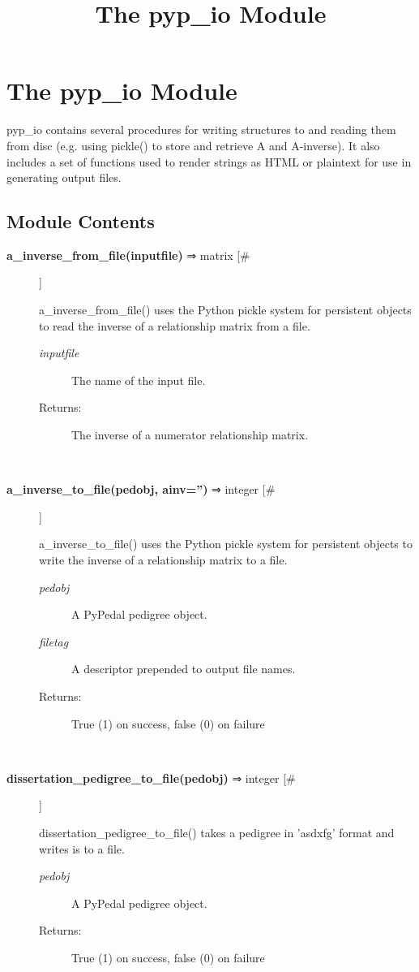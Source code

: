 \documentclass[10pt]{article}
\title{The pyp\_io Module}
\begin{document}
\section*{The pyp\_io Module}


 pyp\_io contains several procedures for writing structures to and reading them from disc (e.g. using pickle() to store and retrieve A and A-inverse). It also includes a set of functions used to render strings as HTML or plaintext for use in generating output files.
\subsection*{Module Contents}
\begin{description}
\item[\textbf{a\_inverse\_from\_file(inputfile)}
 ⇒ matrix [\#]]

 a\_inverse\_from\_file() uses the Python pickle system for persistent objects to read the inverse of a relationship matrix from a file.
\begin{description}
\item[\emph{inputfile}
] The name of the input file.
\item[Returns:] The inverse of a numerator relationship matrix.

\end{description}
\\ 

\item[\textbf{a\_inverse\_to\_file(pedobj, ainv='')}
 ⇒ integer [\#]]

 a\_inverse\_to\_file() uses the Python pickle system for persistent objects to write the inverse of a relationship matrix to a file.
\begin{description}
\item[\emph{pedobj}
] A PyPedal pedigree object.
\item[\emph{filetag}
] A descriptor prepended to output file names.
\item[Returns:] True (1) on success, false (0) on failure

\end{description}
\\ 

\item[\textbf{dissertation\_pedigree\_to\_file(pedobj)}
 ⇒ integer [\#]]

 dissertation\_pedigree\_to\_file() takes a pedigree in 'asdxfg' format and writes is to a file.
\begin{description}
\item[\emph{pedobj}
] A PyPedal pedigree object.
\item[Returns:] True (1) on success, false (0) on failure


\end{description}
\end{description}
\end{document}
